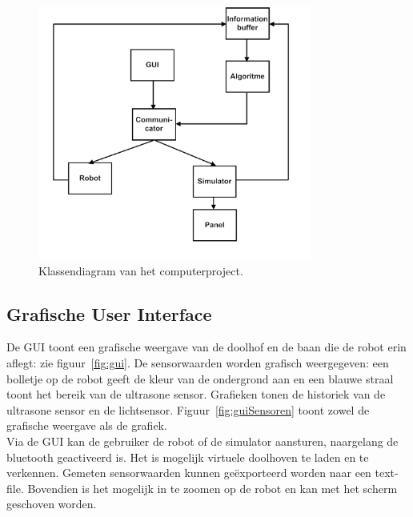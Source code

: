 \documentclass[t1]{penoverslag}
\begin{document}
\begin{figure}[tbp]
\begin{center}
    \includegraphics[width=0.8\textwidth]{Klassendiagram}
    \caption{Klassendiagram van het computerproject.}
    \label{fig:klasDia}
\end{center}
\end{figure}

\subsection{Grafische User Interface} %
\label{ssec:GUI}
De GUI toont een grafische weergave van de doolhof en de baan die de robot erin aflegt: zie figuur~\ref{fig:gui}. De sensorwaarden worden grafisch weergegeven: een bolletje op de robot geeft de kleur van de ondergrond aan en een blauwe straal toont het bereik van de ultrasone sensor. Grafieken tonen de historiek van de ultrasone sensor en de lichtsensor. Figuur~\ref{fig:guiSensoren} toont zowel de grafische weergave als de grafiek. \\

Via de GUI kan de gebruiker de robot of de simulator aansturen, naargelang de bluetooth geactiveerd is. Het is mogelijk virtuele doolhoven te laden en te verkennen. Gemeten sensorwaarden kunnen ge\"exporteerd worden naar een text-file. Bovendien is het mogelijk in te zoomen op de robot en kan met het scherm geschoven worden.
\end{document}
